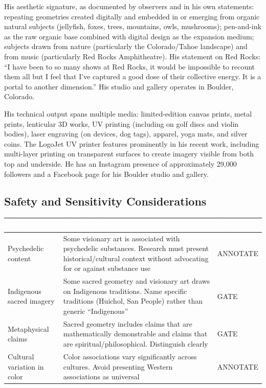 \documentclass[11pt,letterpaper]{article}
\newcommand{\tableheader}[1]{\textbf{\sffamily\textcolor{white}{#1}}}
\begin{document}
His aesthetic signature, as documented by observers and in his own statements: repeating geometries created digitally and embedded in or emerging from organic natural subjects (jellyfish, foxes, trees, mountains, owls, mushrooms); pen-and-ink as the raw organic base combined with digital design as the expansion medium; subjects drawn from nature (particularly the Colorado/Tahoe landscape) and from music (particularly Red Rocks Amphitheatre). His statement on Red Rocks: ``I have been to so many shows at Red Rocks, it would be impossible to recount them all but I feel that I've captured a good dose of their collective energy. It is a portal to another dimension.'' His studio and gallery operates in Boulder, Colorado.

His technical output spans multiple media: limited-edition canvas prints, metal prints, lenticular 3D works, UV printing (including on golf discs and violin bodies), laser engraving (on devices, dog tags), apparel, yoga mats, and silver coins. The LogoJet UV printer features prominently in his recent work, including multi-layer printing on transparent surfaces to create imagery visible from both top and underside. He has an Instagram presence of approximately 29,000 followers and a Facebook page for his Boulder studio and gallery.

\subsection{Safety and Sensitivity Considerations}

\begin{center}
\begin{tabularx}{\textwidth}{L{3.5cm}XL{2.5cm}}
\toprule
{}
\tableheader{Area} & \tableheader{Consideration} & \tableheader{Type} \\
\midrule
Psychedelic content & Some visionary art is associated with psychedelic substances. Research must present historical/cultural context without advocating for or against substance use & ANNOTATE \\
Indigenous sacred imagery & Some sacred geometry and visionary art draws on Indigenous traditions. Name specific traditions (Huichol, San People) rather than generic ``Indigenous'' & GATE \\
Metaphysical claims & Sacred geometry includes claims that are mathematically demonstrable and claims that are spiritual/philosophical. Distinguish clearly & GATE \\
Cultural variation in color & Color associations vary significantly across cultures. Avoid presenting Western associations as universal & ANNOTATE \\
\bottomrule
\end{tabularx}
\end{center}
\end{document}
